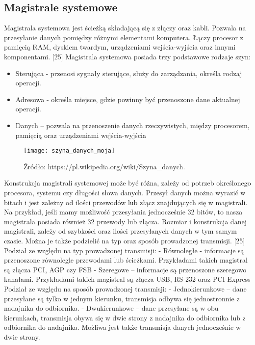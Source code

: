 \documentclass[12pt, a4paper, onside, polish]{article}				%
\begin{document}
\subsection{Magistrale systemowe}
\hspace{\parindent}
Magistrala systemowa jest ścieżką składającą się z złączy oraz kabli. Pozwala na przesyłanie danych pomiędzy różnymi elementami komputera. Łączy procesor z pamięcią RAM, dyskiem twardym, urządzeniami wejścia-wyjścia oraz innymi komponentami. [25]  \newline\newline
Magistrala systemowa posiada trzy podstawowe rodzaje szyn:
\begin{itemize}
\item Sterująca - przenosi sygnały sterujące, służy do zarządzania, określa rodzaj operacji.
\item Adresowa - określa miejsce, gdzie powinny być przenoszone dane aktualnej operacji. 
\item Danych – pozwala na przenoszenie danych rzeczywistych, między procesorem, pamięcią oraz urządzeniami wejścia-wyjścia 
\end{itemize}
 
 
 \begin{figure}[H]
{\centering \texttt{[image: szyna\_danych\_moja]} \caption{Magistrala systemowa} \caption*{Źródło: https://pl.wikipedia.org/wiki/Szyna_danych.}}\vspace{5mm}
\end{figure}


Konstrukcja magistrali systemowej może być różna, zależy od potrzeb określonego procesora, systemu czy długości słowa danych. Przesył danych można wyrazić w bitach i jest zależny od ilości przewodów lub złącz znajdujących się w magistrali. Na przykład, jeśli mamy możliwość przesyłania jednocześnie 32 bitów, to nasza magistrala posiada również 32 przewody lub złącza. Rozmiar i konstrukcja danej magistrali, zależy od szybkości oraz ilości przesyłanych danych w tym samym czasie. Można je także podzielić na typ oraz sposób prowadzonej transmisji. [25] \newline \newline
Podział ze względu na typ prowadzonej transmisji: \newline
- Równoległe - informacje są przenoszone równolegle przewodami lub ścieżkami. Przykładami takich magistral są złącza PCI, AGP czy FSB \newline
- Szeregowe – informacje są przenoszone szeregowo kanałami. Przykładami takich magistral są złącza USB, RS-232 oraz PCI Express \newline\newline
Podział ze względu na sposób prowadzonej transmisji: \newline
- Jednokierunkowe – dane przesyłane są tylko w jednym kierunku, transmisja odbywa się jednostronnie z nadajnika do odbiornika. \newline
- Dwukierunkowe – dane przesyłane są w obu kierunkach, transmisja obywa się w dwie strony z nadajnika do odbiornika lub z odbiornika do nadajnika. Możliwa jest także transmisja danych jednocześnie w dwie strony. \newline
 
\end{document}
